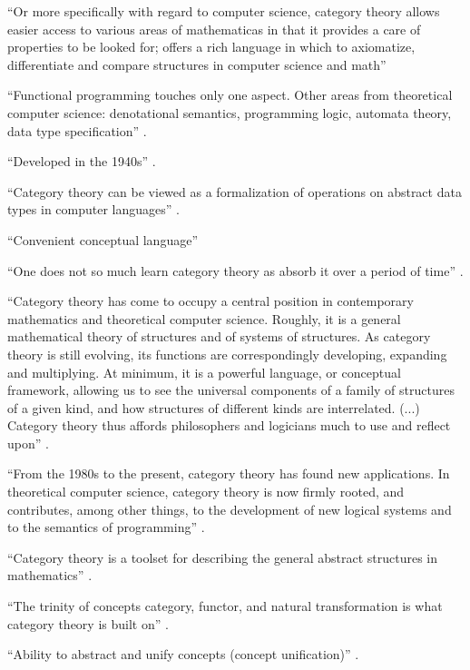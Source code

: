 ``Or more specifically with regard to computer science, category
theory allows easier access to various areas of mathematicas in that
it provides a care of properties to be looked for; offers a rich
language in which to axiomatize, differentiate and compare structures
in computer science and math'' \parencite[414--415]{poigne-1992}

``Functional programming touches only one aspect. Other areas from
theoretical computer science: denotational semantics, programming
logic, automata theory, data type specification''
\parencite[415]{poigne-1992}.

``Developed in the 1940s'' \parencite[1154]{wolfram-2002}.

``Category theory can be viewed as a formalization of operations on
abstract data types in computer languages''
\parencite[1154]{wolfram-2002}.

``Convenient conceptual language'' \parencite[vii]{maclane-1998}

``One does not so much learn category theory as absorb it over a
period of time'' \parencite[25]{bird-demoor-1997}.

``Category theory has come to occupy a central position in
contemporary mathematics and theoretical computer science. Roughly, it
is a general mathematical theory of structures and of systems of
structures. As category theory is still evolving, its functions are
correspondingly developing, expanding and multiplying. At minimum, it
is a powerful language, or conceptual framework, allowing us to see
the universal components of a family of structures of a given kind,
and how structures of different kinds are interrelated. (...) Category
theory thus affords philosophers and logicians much to use and reflect
upon'' \parencite[1]{marquis-2013}.

``From the 1980s to the present, category theory has found new
applications. In theoretical computer science, category theory is now
firmly rooted, and contributes, among other things, to the development
of new logical systems and to the semantics of programming''
\parencite[23]{marquis-2013}.

``Category theory is a toolset for describing the general abstract
structures in mathematics'' \parencite{nlab-category-theory}.

``The trinity of concepts category, functor, and natural
transformation is what category theory is built on''
\parencite{nlab-category-theory}.

``Ability to abstract and unify concepts (concept unification)''
\parencite{nlab-category-theory}.


